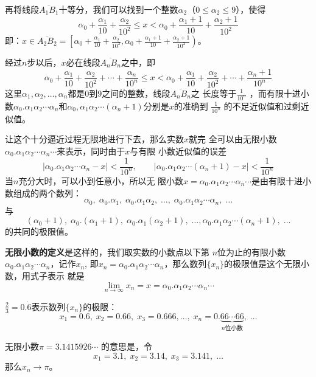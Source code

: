 再将线段$\overline{A_1B_1}$十等分，我们可以找到一个整数$\alpha_2$（$0\le \alpha_2\le 9$），使得
\[\alpha_0+\frac{\alpha_1}{10}+\frac{\alpha_2}{10^2}\le x<\alpha_0+\frac{\alpha_1+1}{10}+\frac{\alpha_2+1}{10^2}\]
即：$x\in\overline{A_2B_2}=\left[\alpha_0+\frac{\alpha_1}{10}+\frac{\alpha_2}{10^2}, \alpha_0+\frac{\alpha_1+1}{10}+\frac{\alpha_2+1}{10^2}\right)$。

经过$n$步以后，$x$必在线段$\overline{A_nB_n}$之中，即
\[\alpha_0+\frac{\alpha_1}{10}+\frac{\alpha_2}{10^2}+\cdots+\frac{\alpha_n}{10^n}\le x<\alpha_0+\frac{\alpha_1}{10}+\frac{\alpha_2}{10^2}+\cdots+\frac{\alpha_n+1}{10^n}\]
这里$\alpha_1,\alpha_2,\ldots,\alpha_n$都是0到9之间的整数，线段$\overline{A_nB_n}$之
长度等于$\frac{1}{10^n}$
，而有限十进小数$\alpha_0.\alpha_1\alpha_2\cdots\alpha_n$和$\alpha_0,\alpha_1\alpha_2\cdots(\alpha_n+1)$分别是$x$的准确到
$\frac{1}{10^n}$
的不足近似值和过剩近似值。

让这个十分逼近过程无限地进行下去，那么实数$x$就完
全可以由无限小数$\alpha_0.\alpha_1\alpha_2\cdots\alpha_n\cdots$来表示，同时由于$x$与有限
小数近似值的误差
\[|\alpha_0.\alpha_1\alpha_2\cdots\alpha_n-x|<\frac{1}{10^n},\qquad  |\alpha_0.\alpha_1\alpha_2\cdots(\alpha_n+1)-x|<\frac{1}{10^n}\]
当$n$充分大时，可以小到任意小，所以无
限小数$x=\alpha_0.\alpha_1\alpha_2\cdots\alpha_n\cdots$是由有限十进小数组成的两个数列：
\[\alpha_0,\; \alpha_0.\alpha_1,\;\alpha_0.\alpha_1\alpha_2,\;\ldots,\;  \alpha_0.\alpha_1\alpha_2\cdots\alpha_n,\;\ldots\]
与
\[(\alpha_0+1),\; \alpha_0.(\alpha_1+1),\;\alpha_0.\alpha_1(\alpha_2+1),\;\ldots, \alpha_0.\alpha_1\alpha_2\cdots(\alpha_n+1),\;\ldots\]
的共同的极限值。

\textbf{无限小数的定义}是这样的，我们取实数的小数点以下第
$n$位为止的有限小数$\alpha_0.\alpha_1\alpha_2\cdots\alpha_n$，记作$x_n$, 即$x_n=\alpha_0.\alpha_1\alpha_2\cdots\alpha_n$，那么数列$\{x_n\}$的极限值是这个无限小数，用式子表示
就是
\[\lim_{n\to\infty}x_n=x=\alpha_0.\alpha_1\alpha_2\cdots\alpha_n\cdots\]


\begin{example}
$\frac{2}{3}=0.\dot{6}$表示数列$\{x_n\}$的极限：
\[x_1=0.6,\; x_2=0.66,\; x_3=0.666,\ldots,\; x_n=0.\underbrace{66\cdots 66}_{\text{$n$位小数}},\; \ldots\]
\end{example}

\begin{example}
    无限小数$\pi=3.1415926\cdots$
    的意思是，令
   \[ x_1=3.1,\; x_2=3.14,\; x_3=3.141,\; \ldots\]
    那么$x_n\to \pi$。
\end{example}

